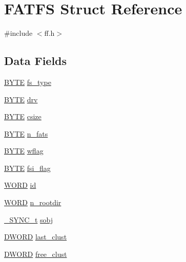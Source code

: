 \hypertarget{structFATFS}{}\section{F\+A\+T\+FS Struct Reference}
\label{structFATFS}


{\ttfamily \#include $<$ff.\+h$>$}

\subsection*{Data Fields}
\begin{DoxyCompactItemize}
\item 
\hyperlink{integer_8h_a4ae1dab0fb4b072a66584546209e7d58}{B\+Y\+TE} \hyperlink{structFATFS_add27d97babe807b573eac98a71dc4ae5}{fs\+\_\+type}
\item 
\hyperlink{integer_8h_a4ae1dab0fb4b072a66584546209e7d58}{B\+Y\+TE} \hyperlink{structFATFS_a6a791560e2687e8b1569bfce61208d2d}{drv}
\item 
\hyperlink{integer_8h_a4ae1dab0fb4b072a66584546209e7d58}{B\+Y\+TE} \hyperlink{structFATFS_a504a1175f6dcc9a854b9da94463bd108}{csize}
\item 
\hyperlink{integer_8h_a4ae1dab0fb4b072a66584546209e7d58}{B\+Y\+TE} \hyperlink{structFATFS_a56716c7e7ac10cf46e73ffb2a2e9b545}{n\+\_\+fats}
\item 
\hyperlink{integer_8h_a4ae1dab0fb4b072a66584546209e7d58}{B\+Y\+TE} \hyperlink{structFATFS_a647e43c9ccae94b7274793d1909897de}{wflag}
\item 
\hyperlink{integer_8h_a4ae1dab0fb4b072a66584546209e7d58}{B\+Y\+TE} \hyperlink{structFATFS_a84e9cdc5a6a8e33ea7ec192058abf161}{fsi\+\_\+flag}
\item 
\hyperlink{integer_8h_a197942eefa7db30960ae396d68339b97}{W\+O\+RD} \hyperlink{structFATFS_a417095d7c20d56d417dc0998e0dd5a5c}{id}
\item 
\hyperlink{integer_8h_a197942eefa7db30960ae396d68339b97}{W\+O\+RD} \hyperlink{structFATFS_a189a00aa038044ffad0fc7f7dcf2aae1}{n\+\_\+rootdir}
\item 
\hyperlink{ffconf_8h_a9a3f0670343e51652dd12b18fa90a9eb}{\+\_\+\+S\+Y\+N\+C\+\_\+t} \hyperlink{structFATFS_a271135f02bd461d14e7db84ea566aa33}{sobj}
\item 
\hyperlink{integer_8h_ad342ac907eb044443153a22f964bf0af}{D\+W\+O\+RD} \hyperlink{structFATFS_ad315def289218e26ab78ff90fde700d1}{last\+\_\+clust}
\item 
\hyperlink{integer_8h_ad342ac907eb044443153a22f964bf0af}{D\+W\+O\+RD} \hyperlink{structFATFS_a5fb49e6ac511bd97eaffdd636d0e4165}{free\+\_\+clust}

\end{DoxyCompactItemize}
